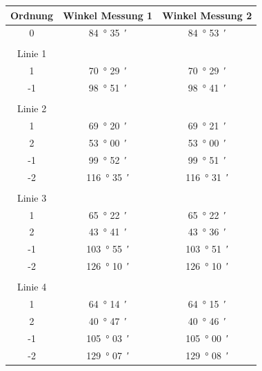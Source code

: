 \documentclass[12pt,a4paper]{article}
\begin{document}
\begin{table}
	\centering
	\begin{tabular}{|c|c|c|}
		\hline
		Ordnung & Winkel Messung 1 & Winkel Messung 2 \\
		\hline
		\hline
		0 & \SI{84}{\degree} \SI{35}{\arcminute} &  \SI{84}{\degree} \SI{53}{\arcminute} \\
		\hline
		&&\\
		Linie 1&& \\
		\hline
		1 & \SI{70}{\degree} \SI{29}{\arcminute} & \SI{70}{\degree} \SI{29}{\arcminute} \\
		\hline
		-1 & \SI{98}{\degree} \SI{51}{\arcminute} & \SI{98}{\degree} \SI{41}{\arcminute} \\
		\hline
		
		&&\\
		Linie 2&& \\
		\hline
		1 & \SI{69}{\degree} \SI{20}{\arcminute} & \SI{69}{\degree} \SI{21}{\arcminute} \\
		\hline
		2 & \SI{53}{\degree} \SI{00}{\arcminute} & \SI{53}{\degree} \SI{00}{\arcminute} \\
		\hline
		-1 & \SI{99}{\degree} \SI{52}{\arcminute} & \SI{99}{\degree} \SI{51}{\arcminute} \\
		\hline
		-2 & \SI{116}{\degree} \SI{35}{\arcminute} & \SI{116}{\degree} \SI{31}{\arcminute} \\
		\hline
		
		&&\\
		Linie 3&&\\
		\hline
		1 & \SI{65}{\degree} \SI{22}{\arcminute} & \SI{65}{\degree} \SI{22}{\arcminute} \\
		\hline
		2 & \SI{43}{\degree} \SI{41}{\arcminute} & \SI{43}{\degree} \SI{36}{\arcminute} \\
		\hline
		-1 & \SI{103}{\degree} \SI{55}{\arcminute} & \SI{103}{\degree} \SI{51}{\arcminute} \\
		\hline
		-2 & \SI{126}{\degree} \SI{10}{\arcminute} & \SI{126}{\degree} \SI{10}{\arcminute} \\
		\hline
		
		&&\\
		Linie 4&&\\
		\hline
		1 & \SI{64}{\degree} \SI{14}{\arcminute} & \SI{64}{\degree} \SI{15}{\arcminute} \\
		\hline
		2 & \SI{40}{\degree} \SI{47}{\arcminute} & \SI{40}{\degree} \SI{46}{\arcminute} \\
		\hline
		-1 & \SI{105}{\degree} \SI{03}{\arcminute} & \SI{105}{\degree} \SI{00}{\arcminute} \\
		\hline
		-2 & \SI{129}{\degree} \SI{07}{\arcminute} & \SI{129}{\degree} \SI{08}{\arcminute} \\
		\hline
		

\end{tabular}
\end{table}
\end{document}
